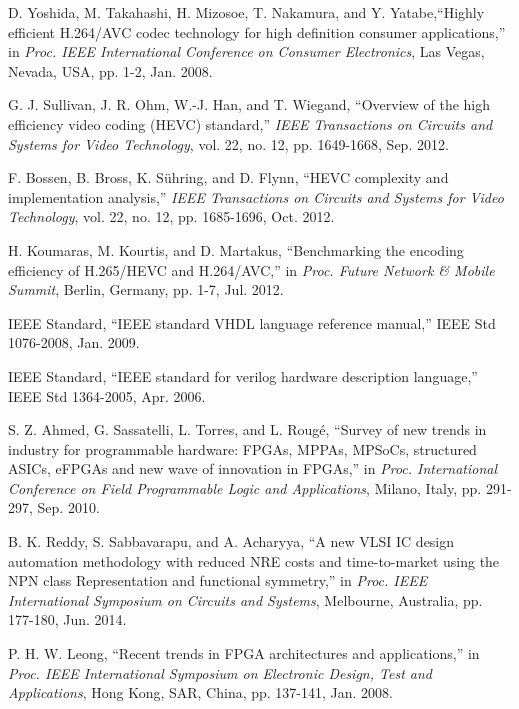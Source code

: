 \begin{thebibliography}{}
%
%

D. Yoshida, M. Takahashi, H. Mizosoe, T. Nakamura, and Y. Yatabe,``Highly efficient H.264/AVC codec technology for high definition consumer applications,'' in \emph{Proc. IEEE International Conference on Consumer Electronics}, Las Vegas, Nevada, USA, pp. 1-2, Jan. 2008.

G. J. Sullivan, J. R. Ohm, W.-J. Han, and T. Wiegand, ``Overview of the high efficiency video coding (HEVC) standard,'' \emph{IEEE Transactions on Circuits and Systems for Video Technology}, vol. 22, no. 12, pp. 1649-1668, Sep. 2012.
	
F. Bossen, B. Bross, K. Sühring, and D. Flynn, ``HEVC complexity and implementation analysis,'' \emph{IEEE Transactions on Circuits and Systems for Video Technology}, vol. 22, no. 12, pp. 1685-1696, Oct. 2012.
	
	H. Koumaras, M. Kourtis, and D. Martakus, ``Benchmarking the encoding efficiency of H.265/HEVC and H.264/AVC,'' in \emph{Proc. Future Network \& Mobile Summit}, Berlin, Germany, pp. 1-7, Jul. 2012.
	
IEEE Standard, ``IEEE standard VHDL language reference manual,'' IEEE Std 1076-2008, Jan. 2009.
	
IEEE Standard, ``IEEE standard for verilog hardware description language,'' IEEE Std 1364-2005, Apr. 2006.

S. Z. Ahmed, G. Sassatelli, L. Torres, and L. Roug\'e, ``Survey of new trends in industry for programmable hardware: FPGAs, MPPAs, MPSoCs, structured ASICs, eFPGAs and new wave of innovation in FPGAs,'' in \emph{Proc. International Conference on Field Programmable Logic and Applications}, Milano, Italy, pp. 291-297, Sep. 2010.

B. K. Reddy, S. Sabbavarapu, and A. Acharyya, ``A new VLSI IC design automation methodology with reduced NRE costs and time-to-market using the NPN class Representation and functional symmetry,'' in \emph{Proc. IEEE International Symposium on Circuits and Systems}, Melbourne, Australia, pp. 177-180, Jun. 2014.

P. H. W. Leong, ``Recent trends in FPGA architectures and applications,'' in \emph{Proc. IEEE International Symposium on Electronic Design, Test and Applications}, Hong Kong, SAR, China, pp. 137-141, Jan. 2008. 


\end{thebibliography}
